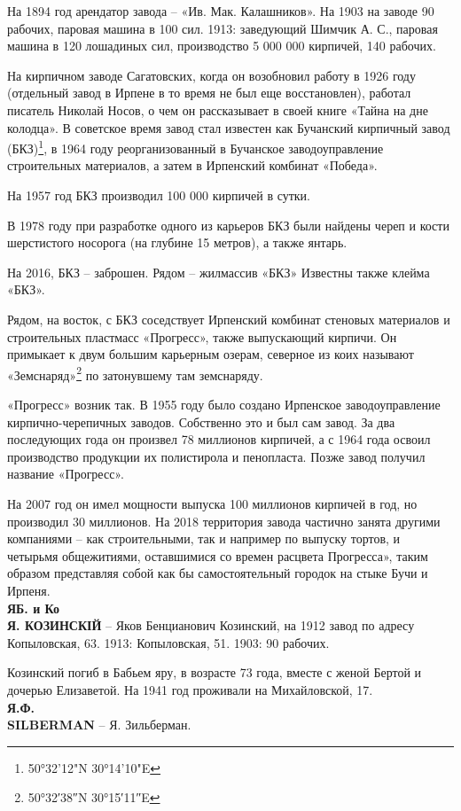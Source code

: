 На 1894 год арендатор завода – «Ив. Мак. Калашников». На 1903 на заводе 90 рабочих, паровая машина в 100 сил. 1913: заведующий Шимчик А. С., паровая машина в 120 лошадиных сил, производство 5 000 000 кирпичей, 140 рабочих.

На кирпичном заводе Сагатовских, когда он возобновил работу в 1926 году (отдельный завод в Ирпене в то время не был еще восстановлен), работал писатель Николай Носов, о чем он рассказывает в своей книге «Тайна на дне колодца». В советское время завод стал известен как Бучанский кирпичный завод (БКЗ)\footnote{ 50°32'12"N 30°14'10"E}, в 1964 году реорганизованный в Бучанское заводоуправление строительных материалов, а затем в Ирпенский комбинат «Победа». 

На 1957 год БКЗ производил 100 000 кирпичей в сутки.

В 1978 году при разработке одного из карьеров БКЗ были найдены череп и кости шерстистого носорога (на глубине 15 метров), а также янтарь.

На 2016, БКЗ – заброшен. Рядом – жилмассив «БКЗ» Известны также клейма «БКЗ».

Рядом, на восток, с БКЗ соседствует Ирпенский комбинат стеновых материалов и строительных пластмасс «Прогресс», также выпускающий кирпичи. Он примыкает к двум большим карьерным озерам, северное из коих называют «Земснаряд»\footnote{50°32′38″N 30°15′11″E} по затонувшему там земснаряду. 

«Прогресс» возник так. В 1955 году было создано Ирпенское заводоуправление кирпично-черепичных заводов. Собственно это и был сам завод. За два последующих года он произвел 78 миллионов кирпичей, а с 1964 года освоил производство продукции их полистирола и пенопласта. Позже завод получил название «Прогресс».

На 2007 год он имел мощности выпуска 100 миллионов кирпичей в год, но производил 30 миллионов. На 2018 территория завода частично занята другими компаниями – как строительными, так и например по выпуску тортов, и четырьмя общежитиями, оставшимися со времен расцвета Прогресса», таким образом представляя собой как бы самостоятельный городок на стыке Бучи и Ирпеня.\\ 

\noindent\textbf{ЯБ. и Ко}\\

\noindent\textbf{Я. КОЗИНСКІЙ} – Яков Бенцианович Козинский, на 1912 завод по адресу Копыловская, 63. 1913: Копыловская, 51. 1903: 90 рабочих.

Козинский погиб в Бабьем яру, в возрасте 73 года, вместе с женой Бертой и дочерью Елизаветой. На 1941 год проживали на Михайловской, 17.\\

\noindent\textbf{Я.Ф.}\\  

\noindent\textbf{SILBERMAN} – Я. Зильберман.\\
